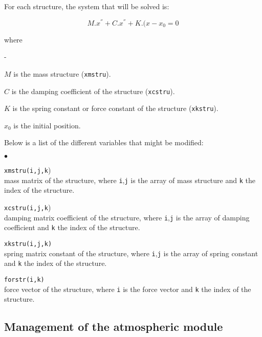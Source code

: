{{For each structure, the system that will be solved is:

\begin{equation}
M.x^{''}+C.x^{''}+K.(x-x_{0} = 0
\end{equation}

where

\begin{list}{-}{}
 \item $M$ is the mass structure (\texttt{xmstru}).
 \item $C$ is the damping coefficient of the structure (\texttt{xcstru}).
 \item $K$ is the spring constant or force constant of the structure (\texttt{xkstru}).
 \item $x_{0}$ is the initial position.
\end{list}

Below is a list of the different variables that might be modified:

\begin{list}{$\bullet$}{}

\item{\texttt{xmstru(i,j,k})} \\
{mass matrix of the structure, where \texttt{i},\texttt{j} is
the array of mass structure and \texttt{k} the index of the structure.}

\item{\texttt{xcstru(i,j,k})}\\
{damping matrix coefficient of the structure, where \texttt{i},\texttt{j} is the array of
damping coefficient and \texttt{k} the index of the structure.}

\item{\texttt{xkstru(i,j,k)}}\\
{spring matrix constant of the structure, where \texttt{i},\texttt{j} is the array of spring
constant and \texttt{k} the index of the structure.}

\item{\texttt{forstr(i,k)}}\\
{force vector of the structure, where \texttt{i} is the force vector and
\texttt{k} the index of the structure.}
\end{list}



\subsection{Management of the atmospheric module}

}}
